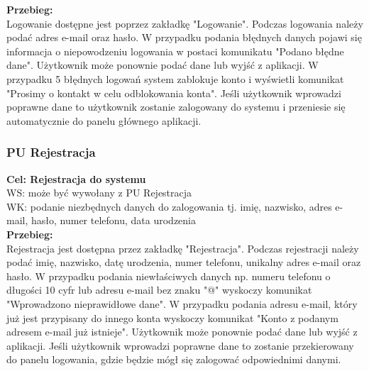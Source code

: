 \documentclass[12pt, letterpaper]{article}
\begin{document}
		\textbf{Przebieg:}\\
		Logowanie dostępne jest poprzez zakładkę "Logowanie". Podczas logowania należy podać adres e-mail oraz hasło. W przypadku podania błędnych danych pojawi się informacja o niepowodzeniu logowania w postaci komunikatu "Podano błędne dane". Użytkownik może ponownie podać dane lub wyjść z aplikacji. W przypadku 5 błędnych logowań system zablokuje konto i wyświetli komunikat "Prosimy o kontakt w celu odblokowania konta". Jeśli użytkownik wprowadzi poprawne dane to użytkownik zostanie zalogowany do systemu i przeniesie się automatycznie do panelu głównego aplikacji.\\
		
		
		\subsubsection{PU Rejestracja}
		
		\quad
		
		\textbf{Cel: Rejestracja do systemu}\\
		
		WS: może być wywołany z PU Rejestracja\\
		
		WK: podanie niezbędnych danych do zalogowania tj. imię, nazwisko, adres e-mail, hasło, numer telefonu, data urodzenia\\
		
		\textbf{Przebieg:}\\
		Rejestracja jest dostępna przez zakładkę "Rejestracja". Podczas rejestracji należy podać imię, nazwisko, datę urodzenia, numer telefonu, unikalny adres e-mail oraz hasło. W przypadku podania niewłaściwych danych np. numeru telefonu o długości 10 cyfr lub adresu e-mail bez znaku "@" wyskoczy komunikat "Wprowadzono nieprawidłowe dane". W przypadku podania adresu e-mail, który już jest przypisany do innego konta wyskoczy komunikat "Konto z podanym adresem e-mail już istnieje". Użytkownik może ponownie podać dane lub wyjść z aplikacji. Jeśli użytkownik wprowadzi poprawne dane to zostanie przekierowany do panelu logowania, gdzie będzie mógł się zalogować odpowiednimi danymi. \\
		
		
\end{document}

